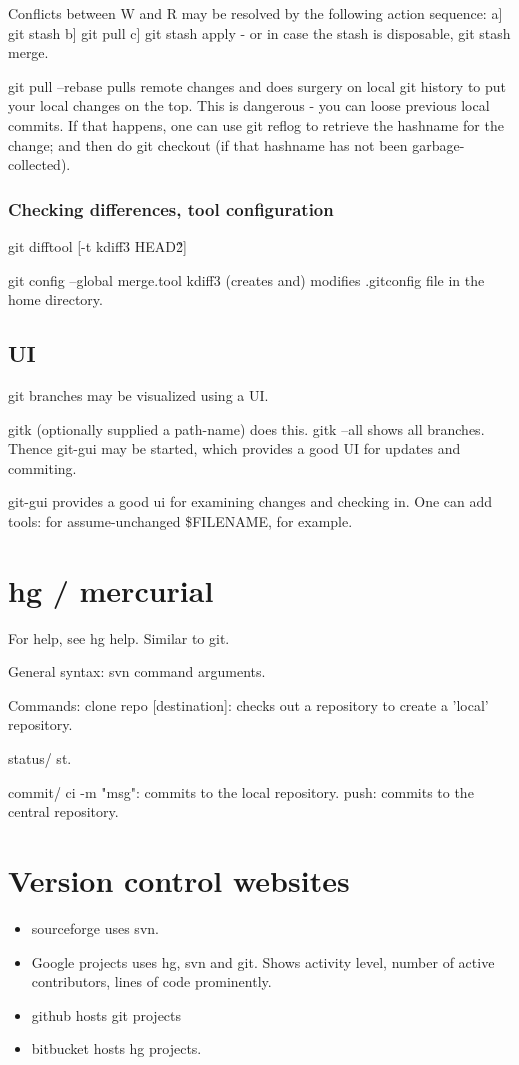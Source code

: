 \documentclass[oneside, article]{memoir}
\begin{document}
Conflicts between W and R may be resolved by the following action sequence: a] git stash b] git pull c] git stash apply - or in case the stash is disposable, git stash merge.

git pull --rebase pulls remote changes and does surgery on local git history to put your local changes on the top. This is dangerous - you can loose previous local commits. If that happens, one can use git reflog to retrieve the hashname for the change; and then do git checkout (if that hashname has not been garbage-collected).

\subsubsection{Checking differences, tool configuration}
git difftool [-t kdiff3 HEAD\~2]

git config --global merge.tool kdiff3 (creates and) modifies .gitconfig file in the home directory.


\subsection{UI}
git branches may be visualized using a UI.

gitk (optionally supplied a path-name) does this. gitk --all shows all branches. Thence git-gui may be started, which provides a good UI for updates and commiting.

git-gui provides a good ui for examining changes and checking in. One can add tools: for assume-unchanged \$FILENAME, for example.

\tbc

\section{hg / mercurial}
For help, see hg help. Similar to git.

General syntax: svn command arguments.

Commands: clone repo [destination]: checks out a repository to create a 'local' repository.

status/ st.

commit/ ci -m "msg": commits to the local repository. push: commits to the central repository.

\section{Version control websites}
\begin{itemize}
\item sourceforge uses svn.
\item Google projects uses hg, svn and  git.
  \subitem Shows activity level, number of active contributors, lines of code prominently.
\item github hosts git projects
\item bitbucket hosts hg projects.
\end{itemize}
\end{document}
